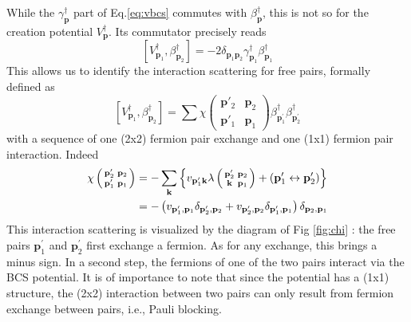 \documentclass[aps,prb,superscriptaddress,twocolumn]{revtex4}
\newcommand{\vk}{\ensuremath{\mathbf{k}}}
\newcommand{\vp}{\ensuremath{\mathbf{p}}}
\begin{document}
While the $\gamma^{\dagger}_\vp$ part of Eq.\eqref{eq:vbcs} commutes with $%
\beta^{\dagger}_\vp$, this is not so for the creation potential $%
V^{\dagger}_\vp$. Its commutator precisely reads 
\begin{equation}  \label{eq:vpotbeta}
\left[V^{\dagger}_{\mathbf{p} _1},\beta^{\dagger}_{\mathbf{p} _2}\right] 
=-2\delta_{\mathbf{p} _1\mathbf{p} _2}\gamma^{\dagger}_{\mathbf{p}
_1}\beta^{\dagger}_{\mathbf{p} _1}
\end{equation}
This allows us to identify the interaction scattering for free pairs,
formally defined as 
\begin{equation}  \label{eq:vBeta}
\left[V^{\dagger}_{\mathbf{p} _1},\beta^{\dagger}_{\mathbf{p} _2}\right] 
=\sum\chi\left(\begin{smallmatrix}\vp'_2&\vp_2\\\vp'_1&\vp_1\end{smallmatrix}%
\right)  \beta^{\dagger}_{\mathbf{p} ^{\prime}_1}\beta^{\dagger}_{\mathbf{p}
^{\prime}_2}
\end{equation}
with a sequence of one (2x2) fermion pair exchange and one (1x1) fermion
pair interaction. Indeed 
\begin{equation}  \label{eq:interactSc}
\begin{split}
\chi\left(\begin{smallmatrix}\vp'_2&\vp_2\\\vp'_1&\vp_1\end{smallmatrix}%
\right)  &=-\sum_\vk\left\{v_{\mathbf{p} ^{\prime}_1\mathbf{k} }\lambda\left(%
\begin{smallmatrix}\vp'_2&\vp_2\\\vk&\vp_1\end{smallmatrix}\right)  +\left(%
\mathbf{p} ^{\prime}_1\leftrightarrow\mathbf{p} ^{\prime}_2\right) \right\} 
\\
&=-\left(v_{\mathbf{p} ^{\prime}_1,\mathbf{p} _1}\delta_{\mathbf{p}
^{\prime}_2,\mathbf{p} _2}+v_{\mathbf{p} ^{\prime}_2,\mathbf{p} _2}\delta_{%
\mathbf{p} ^{\prime}_1,\mathbf{p} _1}\right) \delta_{\mathbf{p} _2,\mathbf{p}
_1}
\end{split}%
\end{equation}
This interaction scattering is visualized by the diagram of Fig \ref{fig:chi}%
: the free pairs $\mathbf{p} ^{\prime}_1$ and $\mathbf{p} ^{\prime}_2$ first
exchange a fermion. As for any exchange, this brings a minus sign. In a
second step, the fermions of one of the two pairs interact via the BCS
potential. It is of importance to note that since the potential has a (1x1)
structure, the (2x2) interaction between two pairs can only result from
fermion exchange between pairs, i.e., Pauli blocking.
\end{document}
